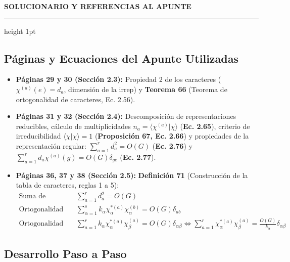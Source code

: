 \documentclass[11pt, a4paper]{article}
\begin{document}
\newpage

\begin{center}
    {\Large \textbf{\textcolor{primary}{SOLUCIONARIO Y REFERENCIAS AL APUNTE}}}
\end{center}
\vspace{1mm}
\hrule height 1pt
\vspace{3mm}

\subsection*{\textcolor{primary}{Páginas y Ecuaciones del Apunte Utilizadas}}
\begin{itemize}
    \item \textbf{Páginas 29 y 30 (Sección 2.3):} Propiedad 2 de los caracteres ($\chi^{(a)}(e) = d_a$, dimensión de la irrep) y \textbf{Teorema 66} (Teorema de ortogonalidad de caracteres, Ec. 2.56).
    \item \textbf{Páginas 31 y 32 (Sección 2.4):} Descomposición de representaciones reducibles, cálculo de multiplicidades $n_a = \langle \chi^{(a)} | \chi \rangle$ (\textbf{Ec. 2.65}), criterio de irreducibilidad $\langle \chi | \chi \rangle = 1$ (\textbf{Proposición 67, Ec. 2.66}) y propiedades de la representación regular: $\sum_{a=1}^r d_a^2 = O(G)$ (\textbf{Ec. 2.76}) y $\sum_{a=1}^r d_a \chi^{(a)}(g) = O(G)\delta_{ge}$ (\textbf{Ec. 2.77}).
    \item \textbf{Páginas 36, 37 y 38 (Sección 2.5):} \textbf{Definición 71} (Construcción de la tabla de caracteres, reglas 1 a 5):
    \begin{align*}
        \text{Suma de dimensiones (Ec. 2.114):} \quad & \sum_{a=1}^r d_a^2 = O(G) \\
        \text{Ortogonalidad por filas (Ec. 2.116):} \quad & \sum_{\alpha=1}^s k_\alpha \chi_\alpha^{*(a)} \chi_\alpha^{(b)} = O(G) \delta_{ab} \\
        \text{Ortogonalidad por columnas (Ec. 2.117):} \quad & \sum_{a=1}^r k_\alpha \chi_\alpha^{*(a)} \chi_\beta^{(a)} = O(G) \delta_{\alpha\beta} \iff \sum_{a=1}^r \chi_\alpha^{*(a)} \chi_\beta^{(a)} = \frac{O(G)}{k_\alpha} \delta_{\alpha\beta}
    \end{align*}
\end{itemize}

\subsection*{\textcolor{primary}{Desarrollo Paso a Paso}}
\end{document}
